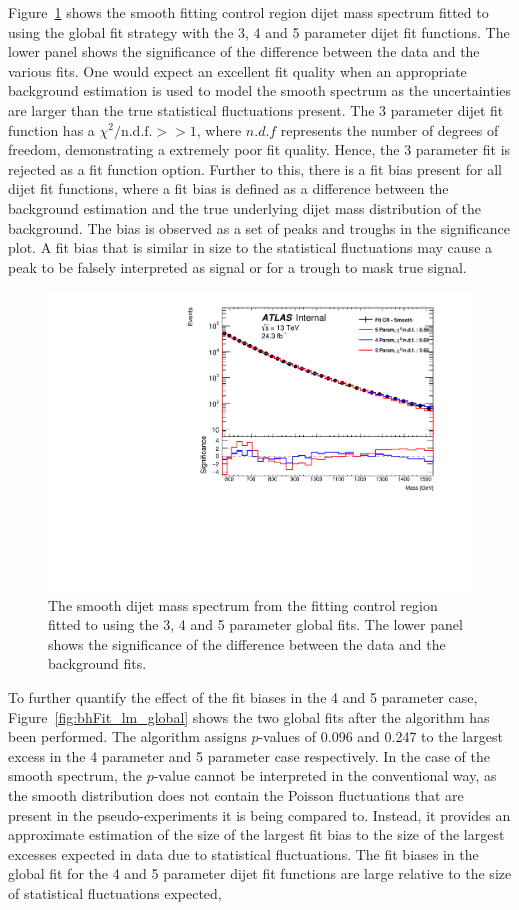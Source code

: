 Figure~\ref{fig:lowmass_globalFit} shows the smooth fitting control region dijet mass spectrum fitted to
using the global fit strategy with the 3, 4 and 5 parameter dijet fit functions.
The lower panel shows the significance of the difference between the data and the various fits.
One would expect an excellent fit quality when an appropriate background estimation is used
to model the smooth spectrum as the uncertainties are larger than the true statistical fluctuations present.
The 3 parameter dijet fit function has a $\chi^{2}/\text{n.d.f.} >> 1$,
where $n.d.f$ represents the number of degrees of freedom, demonstrating a extremely poor fit quality.
Hence, the 3 parameter fit is rejected as a fit function option.
Further to this, there is a fit bias present for all dijet fit functions,
where a fit bias is defined as a difference between the background estimation and the true underlying dijet mass distribution of the background.
The bias is observed as a set of peaks and troughs in the significance plot.
A fit bias that is similar in size to the statistical fluctuations
may cause a peak to be falsely interpreted as signal or for a trough to mask true signal.

\begin{figure}[!htb]
\centering
\includegraphics[width=0.6\linewidth, angle=0]{figs/Dibjet/LowMass/FitStudy_min566/globalFit_lm_dh.pdf}
\caption{\label{fig:lowmass_globalFit}
  The smooth dijet mass spectrum from the \lm{} fitting control region
  fitted to using the 3, 4 and 5 parameter global fits.
  The lower panel shows the significance of the difference between the data and the background fits.}
\end{figure}

To further quantify the effect of the fit biases in the 4 and 5 parameter case,
Figure~\ref{fig:bhFit_lm_global} shows the two global fits after the \bh{} algorithm has been performed.
The \bh{} algorithm assigns \mbox{$p$-values} of 0.096 and 0.247 to the largest excess in the 4 parameter and 5 parameter case respectively.
In the case of the smooth spectrum, the \bh{} \mbox{$p$-value} cannot be interpreted in the conventional way,
as the smooth distribution does not contain the Poisson fluctuations that are present in the pseudo-experiments it is being compared to.
Instead, it provides an approximate estimation of the size of the largest fit bias to the size of the largest excesses expected in data due to statistical fluctuations.
The fit biases in the global fit for the 4 and 5 parameter dijet fit functions are large relative to the size of statistical fluctuations expected,

